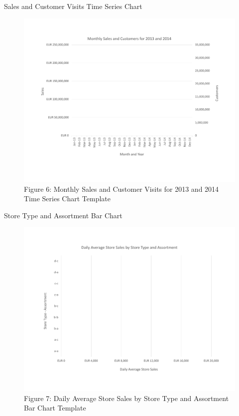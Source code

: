 \documentclass[pdf]{beamer}
\theoremstyle{remark}
\theoremstyle{definition}
\begin{document}
\begin{frame}[t]{Sales and Customer Visits Time Series Chart}
\begin{figure}[htbp]
    \centering
    \captionsetup{justification=centering}
    \includegraphics[clip, trim=0cm 2.3cm 0cm 2.3cm, width=1.0\textwidth]{Line_Chart_Unit_3_Template.pdf}
    \caption{Figure {\color{franklinblue} 6}: Monthly Sales and Customer Visits for 2013 and 2014 Time Series Chart Template}
    \label{fig:linechart0}
\end{figure}
\end{frame}

\begin{frame}[t]{Store Type and Assortment Bar Chart}
\begin{figure}[htbp]
    \centering
    \captionsetup{justification=centering}
    \includegraphics[clip, trim=0cm 2.3cm 0cm 2.3cm, width=1.0\textwidth]{Bar_Chart_Unit_3_Template.pdf}  
    \caption{Figure {\color{franklinblue} 7}: Daily Average Store Sales by Store Type and Assortment Bar Chart Template}
    \label{fig:barchart0}
\end{figure}
\end{frame}
\end{document}
